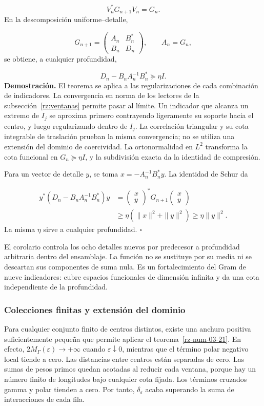 \[
V_n^*G_{n+1}V_n=G_n.
\]
En la descomposición uniforme–detalle,

\[
G_{n+1}=\begin{pmatrix}A_n&B_n^*\\B_n&D_n\end{pmatrix},
\qquad A_n=G_n,
\]
se obtiene, a cualquier profundidad,

\[
\boxed{D_n-B_nA_n^{-1}B_n^*\succeq\eta I.}
\]
\textbf{Demostración.} El teorema se aplica a las regularizaciones de cada combinación de indicadores. La convergencia en norma de los lectores de la subsección~\ref{rz:ventanas} permite pasar al límite. Un indicador que alcanza un extremo de \(I_j\) se aproxima primero contrayendo ligeramente su soporte hacia el centro, y luego regularizando dentro de \(I_j\). La correlación triangular y su cota integrable de traslación prueban la misma convergencia; no se utiliza una extensión del dominio de coercividad. La ortonormalidad en \(L^2\) transforma la cota funcional en \(G_n\succeq\eta I\), y la subdivisión exacta da la identidad de compresión.

Para un vector de detalle \(y\), se toma \(x=-A_n^{-1}B_n^*y\). La identidad de Schur da

\[
\begin{aligned}
y^*(D_n-B_nA_n^{-1}B_n^*)y
&=\begin{pmatrix}x\\y\end{pmatrix}^*G_{n+1}
\begin{pmatrix}x\\y\end{pmatrix}\\
&\geq\eta(\|x\|^2+\|y\|^2)\geq\eta\|y\|^2.
\end{aligned}
\]
La misma \(\eta\) sirve a cualquier profundidad. \hfill\(\square\)

El corolario controla los ocho detalles nuevos por predecesor a profundidad arbitraria dentro del ensamblaje. La función no se sustituye por su media ni se descartan sus componentes de suma nula. Es un fortalecimiento del Gram de nueve indicadores: cubre espacios funcionales de dimensión infinita y da una cota independiente de la profundidad.

\subsubsection*{Colecciones finitas y extensión del dominio}
Para cualquier conjunto finito de centros distintos, existe una anchura positiva suficientemente pequeña que permite aplicar el teorema~\ref{rz-num-03-21}. En efecto, \(2M_\Gamma(\varepsilon)\to+\infty\) cuando \(\varepsilon\downarrow0\), mientras que el término polar negativo local tiende a cero. Las distancias entre centros están separadas de cero. Las sumas de pesos primos quedan acotadas al reducir cada ventana, porque hay un número finito de longitudes bajo cualquier cota fijada. Los términos cruzados gamma y polar tienden a cero. Por tanto, \(\delta_\varepsilon\) acaba superando la suma de interacciones de cada fila.

